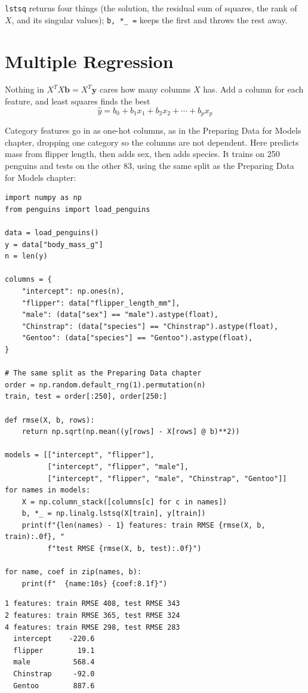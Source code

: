 \verb|lstsq| returns four things (the solution, the residual sum of squares, the rank of $X$, and its singular
values); \verb|b, *_ =| keeps the first and throws the rest away.

\section{Multiple Regression}
Nothing in $X^T X \mathbf{b} = X^T \mathbf{y}$ cares how many columns $X$ has. Add a column for each feature,
and least squares finds the best 
$$\hat{y} = b_0 + b_1 x_1 + b_2 x_2 + \cdots + b_p x_p$$

Category features go in as one-hot columns, as in the Preparing Data for Models chapter, dropping one
category so the columns are not dependent. Here  predicts mass from flipper length,
then adds sex, then adds species. It trains on 250 penguins and tests on the other 83, using the same split
as the Preparing Data for Models chapter:

\begin{verbatim}
import numpy as np
from penguins import load_penguins

data = load_penguins()
y = data["body_mass_g"]
n = len(y)

columns = {
    "intercept": np.ones(n),
    "flipper": data["flipper_length_mm"],
    "male": (data["sex"] == "male").astype(float),
    "Chinstrap": (data["species"] == "Chinstrap").astype(float),
    "Gentoo": (data["species"] == "Gentoo").astype(float),
}

# The same split as the Preparing Data chapter
order = np.random.default_rng(1).permutation(n)
train, test = order[:250], order[250:]

def rmse(X, b, rows):
    return np.sqrt(np.mean((y[rows] - X[rows] @ b)**2))

models = [["intercept", "flipper"],
          ["intercept", "flipper", "male"],
          ["intercept", "flipper", "male", "Chinstrap", "Gentoo"]]
for names in models:
    X = np.column_stack([columns[c] for c in names])
    b, *_ = np.linalg.lstsq(X[train], y[train])
    print(f"{len(names) - 1} features: train RMSE {rmse(X, b, train):.0f}, "
          f"test RMSE {rmse(X, b, test):.0f}")

for name, coef in zip(names, b):
    print(f"  {name:10s} {coef:8.1f}")
\end{verbatim}

\begin{verbatim}
1 features: train RMSE 408, test RMSE 343
2 features: train RMSE 365, test RMSE 324
4 features: train RMSE 298, test RMSE 283
  intercept    -220.6
  flipper        19.1
  male          568.4
  Chinstrap     -92.0
  Gentoo        887.6
\end{verbatim}

